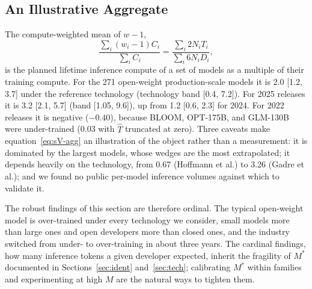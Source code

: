 \subsection{An Illustrative Aggregate}\label{sec:wedge-aggregate}

The compute-weighted mean of $w-1$,
\begin{equation}\label{eq:sV-agg}
\frac{\sum_i(w_i-1)C_i}{\sum_iC_i}=\frac{\sum_i2N_iT_i}{\sum_i6N_iD_i},
\end{equation}
is the planned lifetime inference compute of a set of models as a multiple of their training compute. For the 271
open-weight production-scale models it is 2.0 [1.2, 3.7] under the reference technology (technology band [0.4, 7.2]).
For 2025 releases it is 3.2 [2.1, 5.7] (band [1.05, 9.6]), up from 1.2 [0.6, 2.3] for 2024. For 2022 releases it is
negative ($-0.40$), because BLOOM, OPT-175B, and GLM-130B were under-trained (0.03 with $\hat T$ truncated at zero).
Three caveats make equation~\eqref{eq:sV-agg} an illustration of the object rather than a measurement: it is dominated
by the largest models, whose wedges are the most extrapolated; it depends heavily on the technology, from 0.67 (Hoffmann
et al.) to 3.26 (Gadre et al.); and we found no public per-model inference volumes against which to validate it.

The robust findings of this section are therefore ordinal. The typical open-weight model is over-trained under every
technology we consider, small models more than large ones and open developers more than closed ones, and the industry
switched from under- to over-training in about three years. The cardinal findings, how many inference tokens a given
developer expected, inherit the fragility of $M^*$ documented in Sections~\ref{sec:ident} and~\ref{sec:tech}; calibrating
$M^*$ within families and experimenting at high $M$ are the natural ways to tighten them.

